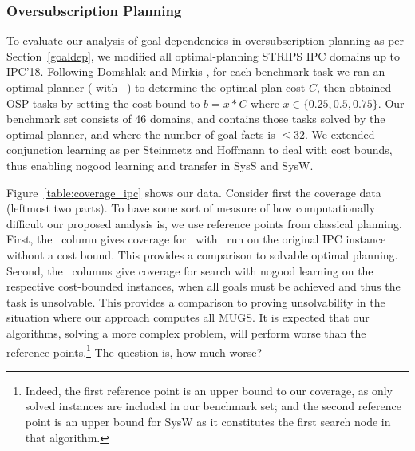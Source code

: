  
\subsubsection*{Oversubscription Planning}

%

To evaluate our analysis of goal dependencies in oversubscription
planning as per Section~\ref{goaldep}, we modified all
optimal-planning STRIPS IPC domains up to IPC'18. Following Domshlak
and Mirkis , for each benchmark
task we ran an optimal planner (\astar
with \hlmcut\ \cite{helmert:domshlak:icaps-09}) to determine the
optimal plan cost $C$, then obtained OSP tasks by setting the cost
bound to $b = x * C$ where $x \in \{0.25, 0.5, 0.75\}$. Our benchmark
set consists of 46 domains, and contains those tasks solved by the
optimal planner, and where the number of goal facts is $\leq 32$.
%
%
We extended conjunction learning as per Steinmetz and
Hoffmann  to deal with cost
bounds, thus enabling nogood learning and transfer in SysS and
SysW. 

Figure~\ref{table:coverage_ipc} shows our data. Consider first the
coverage data (leftmost two parts). To have some sort of measure of
how computationally difficult our proposed analysis is, we use
reference points from classical planning. First, the \hlmcut\ column
gives coverage for \astar\ with \hlmcut\ run on the original IPC
instance without a cost bound. This provides a comparison to solvable
optimal planning. Second, the \hc\ columns give coverage for search
with nogood learning on the respective cost-bounded instances, when
all goals must be achieved and thus the task is unsolvable. This
provides a comparison to proving unsolvability in the situation where
our approach computes all MUGS. 
%
It is expected that our algorithms, solving a more complex problem,
will perform worse than the reference points.\footnote{Indeed, the
first reference point is an upper bound to our coverage, as only
solved instances are included in our benchmark set; and the second
reference point is an upper bound for SysW as it constitutes the first
search node in that algorithm.} The question is, how much worse? 

